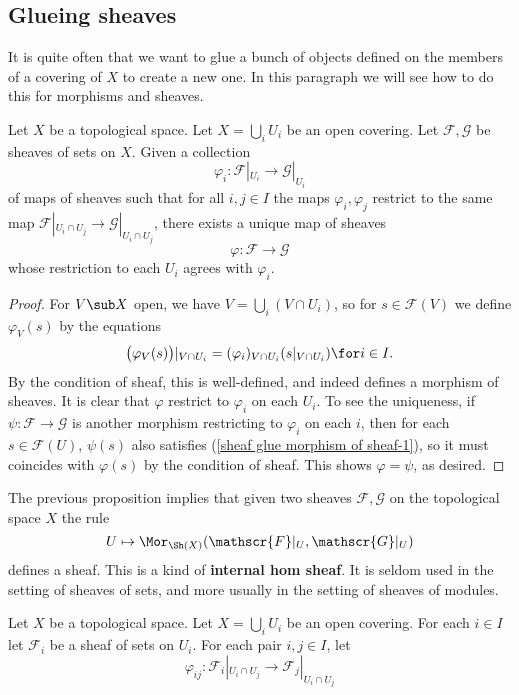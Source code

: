 \subsection{Glueing sheaves}
It is quite often that we want to glue a bunch of objects defined on the members of a covering of $X$ to create a new one. In this paragraph we will see how to do this for morphisms and sheaves.
\begin{proposition}\label{sheaf glue morphism of sheaf}
Let $X$ be a topological space. Let $X=\bigcup_iU_i$ be an open covering. Let $\mathscr{F},\mathscr{G}$ be sheaves of sets on $X$. Given a collection
\[\varphi_i:\mathscr{F}|_{U_i}\to\mathscr{G}|_{U_i}\]
of maps of sheaves such that for all $i,j\in I$ the maps $\varphi_i,\varphi_j$ restrict to the same map $\mathscr{F}|_{U_i\cap U_j}\to\mathscr{G}|_{U_i\cap U_j}$, there exists a unique map of sheaves
\[\varphi:\mathscr{F}\to\mathscr{G}\]
whose restriction to each $U_i$ agrees with $\varphi_i$.
\end{proposition}
\begin{proof}
For $V\sub X$ open, we have $V=\bigcup_i(V\cap U_i)$, so for $s\in\mathscr{F}(V)$ we define $\varphi_V(s)$ by the equations
\begin{align}\label{sheaf glue morphism of sheaf-1}
\big(\varphi_V(s)\big)|_{V\cap U_i}=(\varphi_{i})_{V\cap U_i}(s|_{V\cap U_i})\for i\in I.
\end{align}
By the condition of sheaf, this is well-defined, and indeed defines a morphism of sheaves. It is clear that $\varphi$ restrict to $\varphi_i$ on each $U_i$. To see the uniqueness, if $\psi:\mathscr{F}\to\mathscr{G}$ is another morphism restricting to $\varphi_i$ on each $i$, then for each $s\in\mathscr{F}(U)$, $\psi(s)$ also satisfies (\ref{sheaf glue morphism of sheaf-1}), so it must coincides with $\varphi(s)$ by the condition of sheaf. This shows $\varphi=\psi$, as desired.
\end{proof}
The previous proposition implies that given two sheaves $\mathscr{F},\mathscr{G}$ on the topological space $X$ the rule
\[U\mapsto\Mor_{\Sh(X)}(\mathscr{F}|_U,\mathscr{G}|_U)\]
defines a sheaf. This is a kind of \textbf{internal hom sheaf}. It is seldom used in the setting of sheaves of sets, and more usually in the setting of sheaves of modules.\par
Let $X$ be a topological space. Let $X=\bigcup_iU_i$ be an open covering. For each $i\in I$ let $\mathscr{F}_i$ be a sheaf of sets on $U_i$. For each pair $i,j\in I$, let 
\[\varphi_{ij}:\mathscr{F}_i|_{U_i\cap U_j}\to\mathscr{F}_j|_{U_i\cap U_j}\]

